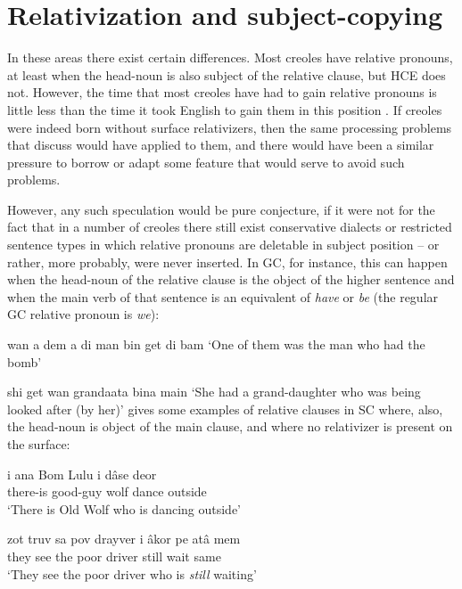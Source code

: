 \section{Relativization and subject-copying}

In these areas there exist certain differences. Most creoles have relative pronouns, at least when the head-noun is also subject of the relative clause, but HCE does not. However, the time that most creoles have had to gain relative pronouns is little less than the time it took English to gain them in this position \citep{BeverEtAl1971}. If creoles were indeed born without surface relativizers, then the same processing problems that \citeauthor{BeverEtAl1971} discuss would have applied to them, and there would have been a similar pressure to borrow or adapt some feature that would serve to avoid such problems.

However, any such speculation would be pure conjecture, if it were not for the fact that in a number of creoles there still exist conservative dialects or restricted sentence types in which relative pronouns are deletable in subject position -- or rather, more probably, were never inserted. In GC, for instance, this can happen when the head-noun of the relative clause is the object of the higher sentence and when the main verb of that sentence is an equivalent of \textit{have} or \textit{be} (the regular GC relative pronoun is \textit{we}):

\ea\label{ex:2:39}
 wan a dem a di man bin get di bam
\glt `One of them was the man who had the bomb'
\z

\ea\label{ex:2:40}
 shi get wan grandaata bina main
\glt `She had a grand-daughter who was being looked after (by her)'
\z
\citet[38]{Corne1977} gives some examples of relative clauses in SC where, also, the head-noun is object of the main clause, and where no relativizer is present on the surface:

\ea\label{ex:2:41}
\gll i ana Bom Lulu i d{\^a}se deor\\
{\PM} there-is good-guy wolf {\PM} dance outside \\
\glt `There is Old Wolf who is dancing outside'
\z




\ea\label{ex:2:42}
\gll zot truv sa pov drayver i {\^a}kor pe at{\^a} mem\\
they see the poor driver {\PM} still {\ASP} wait same\\
\glt `They see the poor driver who is \textit{still} waiting'
\z



